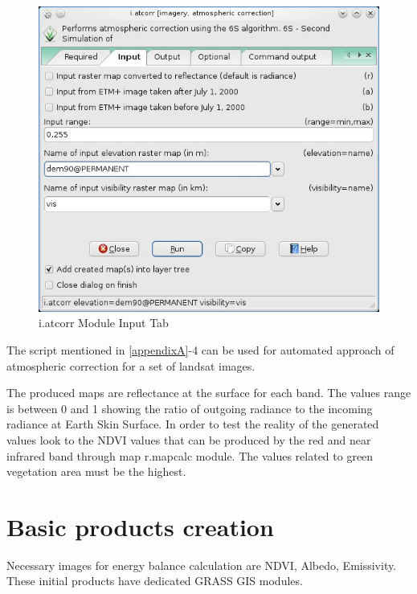 \begin{figure}[htbp]
   \centering
   \includegraphics[scale=0.4]{gipe017.png}
   \caption{i.atcorr Module Input Tab}
   \label{fig:gipe017}
\end{figure}


The script mentioned in \ref{appendixA}-4 can be used for automated approach of atmospheric correction for a set of  landsat images.\newline

The produced maps are reflectance at the surface for each band. The values range is between 0 and 1 showing the ratio of outgoing radiance to the incoming radiance at Earth Skin Surface.  
In order to test the reality of the generated values look to the NDVI values that can be produced by the red and near infrared band through map r.mapcalc module. The values related to green vegetation  area must be the highest. 

\section{Basic products creation}

Necessary images for energy balance calculation are NDVI, Albedo, Emissivity. These initial products have dedicated GRASS GIS modules.\newline

